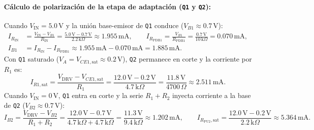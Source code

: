\documentclass[10pt, a4paper, landscape]{article}
\begin{document}
\paragraph{Cálculo de polarización de la etapa de adaptación (\texttt{Q1} y \texttt{Q2}):}
Cuando $V_{\text{IN}} = 5.0\,\text{V}$ y la unión base-emisor de \texttt{Q1} conduce ($V_{B1} \approx 0.7\,\text{V}$):
\begin{align}
    I_{R_{\text{IN}}} &= \frac{V_{\text{IN}} - V_{B1}}{R_{\text{IN}}} = \frac{5.0\,\text{V} - 0.7\,\text{V}}{2.2\,\text{k}\Omega} \approx 1.955\,\text{mA}, \qquad I_{R_{\text{PDB1}}} = \frac{V_{B1}}{R_{\text{PDB1}}} = \frac{0.7\,\text{V}}{10\,\text{k}\Omega} = 0.070\,\text{mA}, \\
    I_{B1} &= I_{R_{\text{IN}}} - I_{R_{\text{PDB1}}} \approx 1.955\,\text{mA} - 0.070\,\text{mA} = 1.885\,\text{mA}.
\end{align}
Con \texttt{Q1} saturado ($V_A = V_{CE1,\text{sat}} \approx 0.2\,\text{V}$), \texttt{Q2} permanece en corte y la corriente por $R_1$ es:
\begin{equation}
    I_{R1,\text{sat}} = \frac{V_{\text{DRV}} - V_{CE1,\text{sat}}}{R_1} = \frac{12.0\,\text{V} - 0.2\,\text{V}}{4.7\,\text{k}\Omega} = \frac{11.8\,\text{V}}{4700\,\Omega} \approx 2.511\,\text{mA}.
\end{equation}
Cuando $V_{\text{IN}} = 0\,\text{V}$, \texttt{Q1} entra en corte y la serie $R_1 + R_2$ inyecta corriente a la base de \texttt{Q2} ($V_{B2} \approx 0.7\,\text{V}$):
\begin{equation}
    I_{B2} = \frac{V_{\text{DRV}} - V_{B2}}{R_1 + R_2} = \frac{12.0\,\text{V} - 0.7\,\text{V}}{4.7\,\text{k}\Omega + 4.7\,\text{k}\Omega} = \frac{11.3\,\text{V}}{9.4\,\text{k}\Omega} \approx 1.202\,\text{mA}, \qquad I_{R_{\text{PU2}},\text{sat}} = \frac{12.0\,\text{V} - 0.2\,\text{V}}{2.2\,\text{k}\Omega} \approx 5.364\,\text{mA}.
\end{equation}
\end{document}
